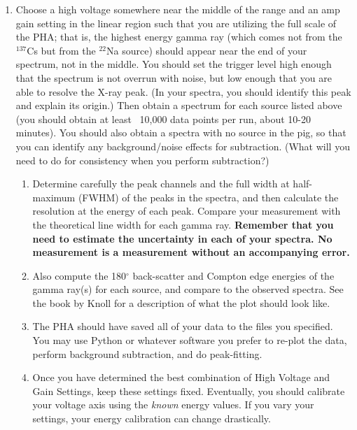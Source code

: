 \documentclass{../lab}
\begin{document}
\begin{enumerate}
    \item Choose a high voltage somewhere near the middle of the range and an amp gain setting in the linear region such that you are utilizing the full scale of the PHA; that is, the highest energy gamma ray (which comes not from the $^{137}$Cs but from the $^{22}$Na source) should appear near the end of your spectrum, not in the middle. You should set the trigger level high enough that the spectrum is not overrun with noise, but low enough that you are able to resolve the X-ray peak. (In your spectra, you should identify this peak and explain its origin.) Then obtain a spectrum for each source listed above (you should obtain at least ~10,000 data points per run, about 10-20 minutes). You should also obtain a spectra with no source in the pig, so that you can identify any background/noise effects for subtraction. (What will you need to do for consistency when you perform subtraction?)
    \begin{enumerate}
        \item Determine carefully the peak channels and the full width at half-maximum (FWHM) of the peaks in the spectra, and then calculate the resolution at the energy of each peak. Compare your measurement with the theoretical line width for each gamma ray. \textbf{Remember that you need to estimate the uncertainty in each of your spectra. No measurement is a measurement without an accompanying error.}

        \item Also compute the 180$^\circ$ back-scatter and Compton edge energies of the gamma ray(s) for each source, and compare to the observed spectra. See the book by Knoll for a description of what the plot should look like.
        
        

        \item The PHA should have saved all of your data to the files you specified. You may use Python or whatever software you prefer to re-plot the data, perform background subtraction, and do peak-fitting.

        \item Once you have determined the best combination of High Voltage and Gain Settings, keep these settings fixed. Eventually, you should calibrate your voltage axis using the \emph{known} energy values. If you vary your settings, your energy calibration can change drastically.


\end{enumerate}
\end{enumerate}
\end{document}
